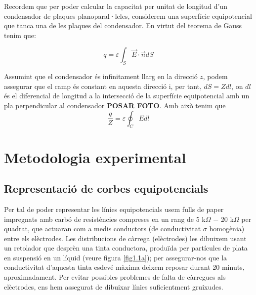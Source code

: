 \documentclass[a4paper,10.5pt]{report}
\begin{document}
	Recordem que per poder calcular la capacitat per unitat de longitud d'un condensador de plaques planoparal·leles, considerem una superfície equipotencial que tanca una de les plaques del condensador. En virtut del teorema de Gauss tenim que:
	
	\begin{equation}
		q = \varepsilon \int_S \vec{E}\cdot \vec{n}dS
	\end{equation}
	
	Assumint que el condensador és infinitament llarg en la direcció $z$, podem assegurar que el camp és constant en aquesta direcció i, per tant, $dS = Zdl$, on $dl$ és el diferencial de longitud a la intersecció de la superfície equipotencial amb un pla perpendicular al condensador \textbf{POSAR FOTO}. Amb això tenim que
	\begin{equation}
		\frac{q}{Z} = \varepsilon \oint_C E dl \label{eq1.13}
	\end{equation}
	
	\section{Metodologia experimental}
	\subsection{Representació de corbes equipotencials}
	Per tal de poder representar les línies equipotencials usem fulls de paper impregnats amb carbó de resistències compreses en un rang de 5 k$\Omega$ $-$ 20 k$\Omega$ per quadrat, que actuaran com a medis conductors (de conductivitat $\sigma$ homogènia) entre els elèctrodes. Les distribucions de càrrega (elèctrodes) les dibuixem usant un retolador que desprèn una tinta conductora, produïda per partícules de plata en suspensió en un líquid (veure figura \ref{fig1.1a}); per assegurar-nos que la conductivitat d'aquesta tinta esdevé màxima deixem reposar durant 20 minuts, aproximadament. Per evitar possibles problemes de falta de càrregues als elèctrodes, ens hem assegurat de dibuixar línies suficientment gruixudes.
	
\end{document}
